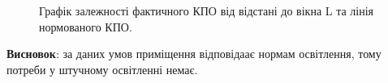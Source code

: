 \documentclass[a4paper,14pt]{extreport}
\begin{document}
\begin{figure}[h]
\caption{Графік залежності фактичного КПО від відстані до вікна L та лінія нормованого КПО.}
\end{figure}
\textbf{Висновок}: за даних умов приміщення відповідаає нормам освітлення, тому потреби у штучному освітленні немає.
\end{document}
